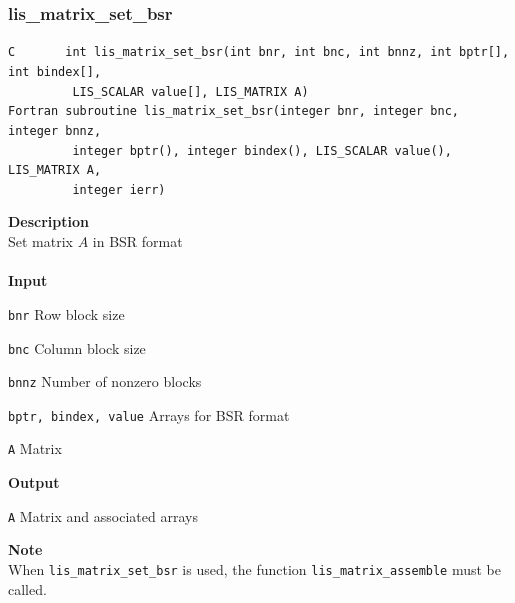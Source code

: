 \documentclass[a4paper]{article}
\newcommand{\namelistlabel}[1]{\mbox{#1}\hfill}
\newenvironment{namelist}[1]{%
 \begin{list}{}
  {\let\makelabel\namelistlabel
  \settowidth{\labelwidth}{#1}
  \setlength{\leftmargin}{1.1\labelwidth}}
}{%
\end{list}}
\begin{document}
  \subsubsection{lis\_matrix\_set\_bsr}
\begin{screen}
\verb|C       int lis_matrix_set_bsr(int bnr, int bnc, int bnnz, int bptr[], int bindex[],|\\
\verb|         LIS_SCALAR value[], LIS_MATRIX A)|\\
\verb|Fortran subroutine lis_matrix_set_bsr(integer bnr, integer bnc, integer bnnz,|\\
\verb|         integer bptr(), integer bindex(), LIS_SCALAR value(), LIS_MATRIX A,|\\
\verb|         integer ierr)|
\end{screen}
{\bf Description}\\
\indent
Set matrix $A$ in BSR format
\\ \\
\noindent
{\bf Input}
\begin{namelist}{XXXXXXXXXXXXXXXXXXXX}
\item[\tt bnr] Row block size
\item[\tt bnc] Column block size
\item[\tt bnnz] Number of nonzero blocks
\item[\tt bptr, bindex, value] Arrays for BSR format
\item[\tt A] Matrix
\end{namelist}
{\bf Output}
\begin{namelist}{XXXXXXXXXXXXXXXXXXXX}
\item[\tt A] Matrix and associated arrays
\end{namelist}
\noindent
{\bf Note}\\
\indent
When \verb|lis_matrix_set_bsr| is used, 
the function \verb|lis_matrix_assemble| must be called. 

\end{document}
